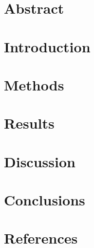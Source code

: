 \documentclass[12pt]{article}
\begin{document}

\restoregeometry

\setcounter{tocdepth}{5}
\tableofcontents
\pagebreak

\listoffigures
\listoftables
\pagebreak

\section*{Abstract}


\section{Introduction}


\section{Methods}


\section{Results}


\section{Discussion}


\section{Conclusions}



\section{References}
\label{sec:ref}
\printbibliography[heading=none]
\end{document}
